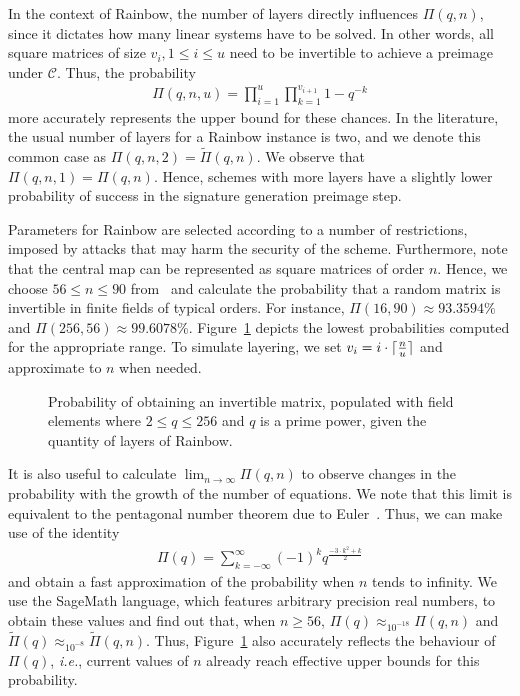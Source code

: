 \documentclass[draft, 12pt, a4paper, oneside]{memoir}
\DeclareMathOperator*{\argmin}{argmin}
\DeclarePairedDelimiter{\ceil}{\lceil}{\rceil}
\theoremstyle{definition}
\begin{document}
In the context of Rainbow, the number of layers directly influences
$\Pi(q, n)$, since it dictates how many linear systems have to be solved. In
other words, all square matrices of size $v_{i}, 1 \leq i \leq u$ need to
be invertible to achieve a preimage under $\mathcal{C}$. Thus, the probability
\begin{align}
  \Pi(q, n, u) = \prod_{i = 1}^{u} \prod_{k = 1}^{v_{i + 1}} 1 - q^{-k}
\end{align}
more accurately represents the upper bound for these chances. In the
literature, the usual number of layers for a Rainbow instance is two, and we
denote this common case as $\Pi(q, n, 2) = \widetilde{\Pi}(q, n)$. We observe
that $\Pi(q, n, 1) = \Pi(q, n)$. Hence, schemes with more layers have a
slightly lower probability of success in the signature generation preimage
step.

Parameters for Rainbow are selected according to a number of restrictions,
imposed by attacks that may harm the security of the scheme. Furthermore, note
that the central map can be represented as square matrices of order $n$. Hence,
we choose $56 \leq n \leq 90$
from~\cite[Tables 6.4, 6.8, 6.13]{Petzoldt:201307} and calculate the
probability that a random matrix is invertible in finite fields of typical
orders. For instance, $\Pi(16, 90) \approx 93.3594\%$ and
$\Pi(256, 56) \approx 99.6078\%$. Figure~\ref{fig:1} depicts the lowest
probabilities computed for the appropriate range. To simulate layering, we set
$v_{i} = i \cdot \ceil{\frac{n}{u}}$ and approximate to $n$ when needed.

\begin{figure}[htbp]
  \subfloat[
    $\argmin_{56 \leq n \leq 90}$ of $\Pi(q, n)$
    and $\widetilde{\Pi}(q, n)$.\label{fig:1a}
  ]{
  }
  \caption{Probability of obtaining an invertible matrix, populated with field
    elements where $2 \leq q \leq 256$ and $q$ is a prime power, given the
    quantity of layers of Rainbow.}\label{fig:1}
\end{figure}

It is also useful to calculate $\lim_{n \to \infty} \Pi(q, n)$ to observe
changes in the probability with the growth of the number of equations. We note that this limit is equivalent to the pentagonal number theorem due to Euler~\cite[Theorem 14.3]{Apostol:2010}. Thus, we can make use of the identity
\begin{align}
  \Pi(q) = \sum_{k = -\infty}^{\infty}
    {(-1)}^{k} q^{\frac{-3 \cdot k^{2} + k}{2}}
\end{align}
and obtain a fast approximation of the probability when $n$ tends to infinity.
We use the SageMath language, which features arbitrary precision real numbers,
to obtain these values and find out that, when $n \geq 56$,
$\Pi(q) \approx_{10^{-18}} \Pi(q, n)$ and
$\widetilde{\Pi}(q) \approx_{10^{-8}} \widetilde{\Pi}(q, n)$.
Thus, Figure~\ref{fig:1} also accurately reflects the behaviour of $\Pi(q)$,
\emph{i.e.}, current values of $n$ already reach effective upper bounds for
this probability.
\end{document}
